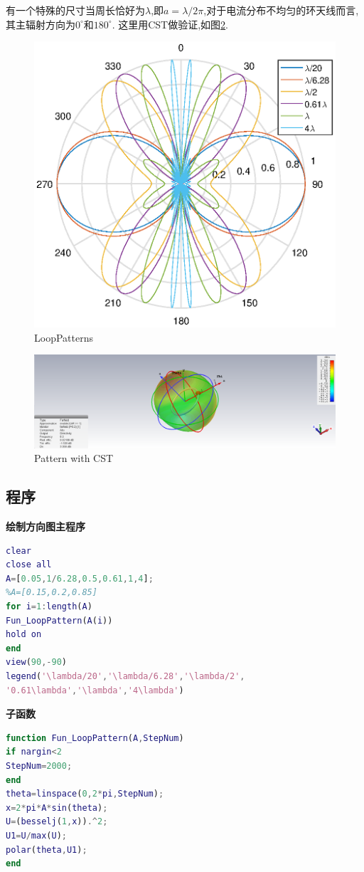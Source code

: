 有一个特殊的尺寸当周长恰好为$\lambda$,即$a=\lambda/2\pi$,对于电流分布不均匀的环天线而言,其主辐射方向为$0^\circ $和$180^\circ $.
这里用CST做验证,如图\ref{fig:loopcst}.
\begin{figure}[!ht]
	\centering
	\includegraphics[width=12cm]{loop_all.eps}
	\caption{LoopPatterns} \label{fig:loopall}
\end{figure}

\begin{figure}[!ht]
	\centering
	\includegraphics[width=12cm]{loop_cst.png}
	\caption{Pattern with CST} \label{fig:loopcst}
\end{figure}

\subsection{程序}
\noindent \textbf{绘制方向图主程序}
\begin{lstlisting}[language={matlab},keywordstyle=\color{blue!70},commentstyle=\color{red!50!green!50!blue!50},frame=shadowbox, rulesepcolor=\color{red!20!green!20!blue!20}] 
%主程序
clear
close all
A=[0.05,1/6.28,0.5,0.61,1,4];
%A=[0.15,0.2,0.85]
for i=1:length(A)
Fun_LoopPattern(A(i))
hold on
end
view(90,-90)
legend('\lambda/20','\lambda/6.28','\lambda/2',
'0.61\lambda','\lambda','4\lambda')
\end{lstlisting}
\noindent \textbf{子函数}
\begin{lstlisting}[language={matlab},keywordstyle=\color{blue!70},commentstyle=\color{red!50!green!50!blue!50},frame=shadowbox, rulesepcolor=\color{red!20!green!20!blue!20}] 
%子函数
function Fun_LoopPattern(A,StepNum)
if nargin<2
StepNum=2000;
end
theta=linspace(0,2*pi,StepNum);
x=2*pi*A*sin(theta);
U=(besselj(1,x)).^2;
U1=U/max(U);
polar(theta,U1);
end

\end{lstlisting}

